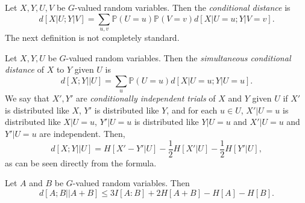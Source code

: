 \documentclass[12pt]{article}
\begin{document}
\begin{definition}
	Let $X, Y, U, V$ be $G$-valued random variables. Then the \emph{conditional distance} is
	\[
		d[X|U; Y|V] = \sum_{u,v} \mathbb{P}(U = u) \mathbb{P}(V = v) d[X|U = u; Y|V = v].
	\]
	The next definition is not completely standard.

	Let $X, Y, U$ be $G$-valued random variables. Then the \emph{simultaneous conditional distance} of $X$ to $Y$ given $U$ is
	\[
		d[X; Y || U] = \sum_u \mathbb{P}(U = u) d[X|U = u ; Y|U = u].
	\]
	We say that $X', Y'$ are \emph{conditionally independent trials} of $X$ and $Y$ given $U$ if $X'$ is distributed like $X$, $Y'$ is distributed like $Y$, and for each $u \in U$, $X'|U = u$ is distributed like $X|U = u$, $Y'|U = u$ is distributed like $Y|U = u$ and $X'|U = u$ and $Y'|U = u$ are independent. Then,
	\[
		d[X; Y || U] = H[X' - Y'|U] - \frac 12 H[X'|U] - \frac 12 H[Y'|U],
	\]
	as can be seen directly from the formula.
\end{definition}

\begin{lemma}
	Let $A$ and $B$ be $G$-valued random variables. Then
	\[
		d[A; B || A + B] \leq 3 I[A:B] + 2 H[A + B] - H[A] - H[B].
	\]
\end{lemma}
\end{document}

